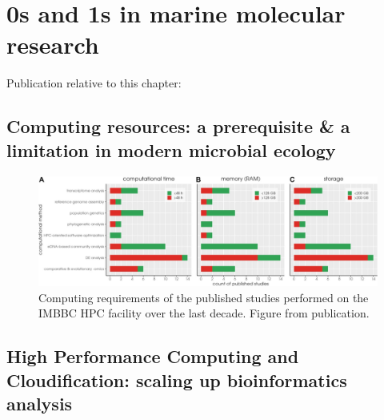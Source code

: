 % 
% 

\chapter{0s and 1s in marine molecular research}
\label{cha:hpc}


Publication relative to this chapter: \cite{zafeiropoulos20210s}


\section{Computing resources: a  prerequisite \& a limitation in modern microbial ecology}




\begin{figure}{}
   \centering
   \includegraphics[width=140mm]{figures/zorbas_jobs_resources.jpeg}
   \caption{Computing requirements of the published studies performed on the IMBBC HPC facility over the last decade. Figure from publication.
   }
   \label{fig:zorba_jobs}
\end{figure}


\section{High Performance Computing and Cloudification: scaling up bioinformatics analysis}



